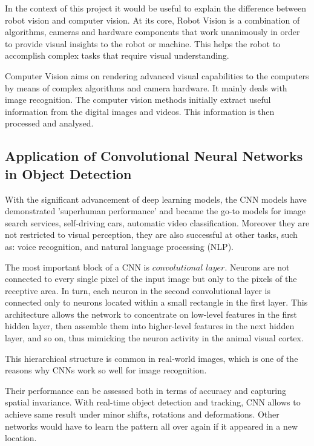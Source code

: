 \documentclass[runningheads]{llncs}
\begin{document}
In the context of this project it would be useful to explain the difference between robot vision and computer vision. At its core, Robot Vision is a combination of algorithms, cameras and hardware components that work unanimously in order to provide visual insights to the robot or machine. This helps the robot to accomplish complex tasks that require visual understanding.

Computer Vision aims on rendering advanced visual capabilities to the computers by means of complex algorithms and camera hardware. It mainly deals with image recognition. The computer vision methods initially extract useful information from the digital images and videos. This information is then processed and analysed.\cite {ref_url1} 

\subsection{Application of Convolutional Neural Networks in Object Detection} 

With the significant advancement of deep learning models, the CNN models have demonstrated 'superhuman performance' and became the go-to models for image search services, self-driving cars, automatic video classification. Moreover they are not restricted to visual perception, they are also successful at other tasks, such as: voice recognition, and natural language processing (NLP).\cite{ref_book} 

The most important block of a CNN is $convolutional$ $layer$. Neurons are not connected to every single pixel of the input image but only to the pixels of the receptive area. In turn, each neuron in the second convolutional layer is connected only to neurons located within a small rectangle in the first layer. This architecture allows the network to concentrate on low-level features in the first hidden layer, then assemble them into higher-level features in the next hidden layer, and so on, thus mimicking the neuron activity in the animal visual cortex.

This hierarchical structure is common in real-world images, which is one of the reasons why CNNs work so well for image recognition.\cite{ref_book2}

Their performance can be assessed both in terms of accuracy and capturing spatial invariance. With real-time object detection and tracking, CNN allows to achieve same result under minor shifts, rotations and deformations. Other networks would have to learn the pattern all over again if it appeared in a new location.\cite {ref_article1}  		
\end{document}
